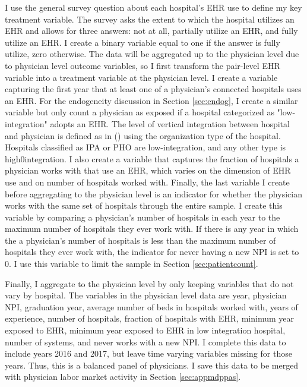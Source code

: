 \documentclass[12pt]{article}
\begin{document}
I use the general survey question about each hospital's EHR use to define my key treatment variable. The survey asks the extent to which the hospital utilizes an EHR and allows for three answers: not at all, partially utilize an EHR, and fully utilize an EHR. I create a binary variable equal to one if the answer is fully utilize, zero otherwise. The data will be aggregated up to the physician level due to physician level outcome variables, so I first transform the pair-level EHR variable into a treatment variable at the physician level. I create a variable capturing the first year that at least one of a physician's connected hospitals uses an EHR. For the endogeneity discussion in Section \ref{sec:endog}, I create a similar variable but only count a physician as exposed if a hospital categorized as "low-integration" adopts an EHR. The level of vertical integration between hospital and physician is defined as in \citeauthor{dynan1998assessing} (\citeyear{dynan1998assessing}) using the organization type of the hospital. Hospitals classified as IPA or PHO are low-integration, and any other type is high0integration. I also create a variable that captures the fraction of hospitals a physician works with that use an EHR, which varies on the dimension of EHR use and on number of hospitals worked with. Finally, the last variable I create before aggregating to the physician level is an indicator for whether the physician works with the same set of hospitals through the entire sample. I create this variable by comparing a physician's number of hospitals in each year to the maximum number of hospitals they ever work with. If there is any year in which the a physician's number of hospitals is less than the maximum number of hospitals they ever work with, the indicator for never having a new NPI is set to 0. I use this variable to limit the sample in Section \ref{sec:patientcount}. 

Finally, I aggregate to the physician level by only keeping variables that do not vary by hospital. The variables in the physician level data are year, physician NPI, graduation year, average number of beds in hospitals worked with, years of experience, number of hospitals, fraction of hospitals with EHR, minimum year exposed to EHR, minimum year exposed to EHR in low integration hospital, number of systems, and never works with a new NPI. I complete this data to include years 2016 and 2017, but leave time varying variables missing for those years. Thus, this is a balanced panel of physicians. I save this data to be merged with physician labor market activity in Section \ref{sec:appmdppas}.
\end{document}
